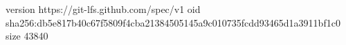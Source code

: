 version https://git-lfs.github.com/spec/v1
oid sha256:db5e817b40c67f5809f4cba21384505145a9c010735fcdd93465d1a3911bf1c0
size 43840
